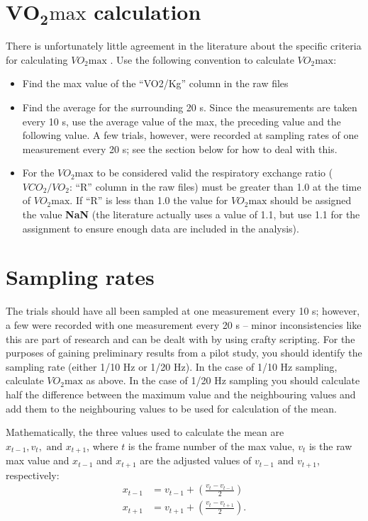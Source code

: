 \documentclass[12pt,a4paper]{article}
\begin{document}
\section{$\mathbf{VO_{2}}\text{max}$ calculation}
There is unfortunately little agreement in the literature about the specific criteria for calculating $VO_{2}\text{max}$ \parencite[see, for example, ][]{Robergs2010}.
Use the following convention to calculate $VO_{2}\text{max}$: 
\begin{itemize}
	\item Find the max value of the ``VO2/Kg'' column in the raw files
	\item Find the average for the surrounding 20 s. Since the measurements are taken every 10 s, use the average value of the max, the preceding value and the following value. A few trials, however, were recorded at sampling rates of one measurement every 20 s; see the section below for how to deal with this. 
	\item For the $VO_{2}\text{max}$ to be considered valid the respiratory exchange ratio ($VCO_{2}/VO_{2}$: ``R'' column in the raw files) must be greater than 1.0 at the time of $VO_{2}\text{max}$. If ``R'' is less than 1.0 the value for $VO_{2}\text{max}$ should be assigned the value \textbf{NaN} (the literature actually uses a value of 1.1, but use 1.1 for the assignment to ensure enough data are included in the analysis).
\end{itemize}

\section{Sampling rates}
The trials should have all been sampled at one measurement every 10 s; however, a few were recorded with one measurement every 20 s – minor inconsistencies like this are part of research and can be dealt with by using crafty scripting.
For the purposes of gaining preliminary results from a pilot study, you should identify the sampling rate (either 1/10 Hz or 1/20 Hz).
In the case of 1/10 Hz sampling, calculate $VO_{2}\text{max}$ as above.
In the case of 1/20 Hz sampling you should calculate half the difference between the maximum value and the neighbouring values and add them to the neighbouring values to be used for calculation of the mean.

Mathematically, the three values used to calculate the mean are $x_{t-1}, v_t, \text{ and } x_{t+1}$, where $t$ is the frame number of the max value, $v_t$ is the raw max value and $x_{t-1}$ and $x_{t+1}$ are the adjusted values of $v_{t-1} \text{ and } v_{t+1}$, respectively:
\begin{align*}
x_{t-1} &= v_{t-1} + \left(\frac{v_{t} - v_{t-1}}{2}\right)\\
x_{t+1} &= v_{t+1} + \left(\frac{v_{t} - v_{t+1}}{2}\right).
\end{align*}
\printbibliography
\end{document}
